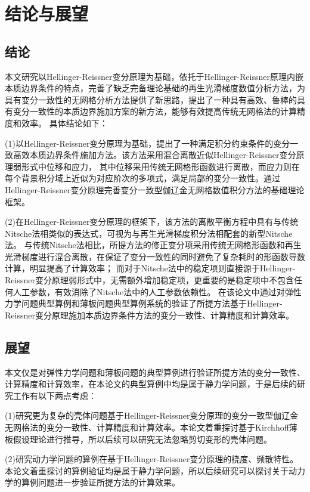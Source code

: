 \chapter{结论与展望}
\section{结论}
本文研究以Hellinger-Reissner变分原理为基础，依托于Hellinger-Reissner原理内嵌本质边界条件的特点，完善了缺乏完备理论基础的再生光滑梯度数值分析方法，为具有变分一致性的无网格分析方法提供了新思路，提出了一种具有高效、鲁棒的具有变分一致性的本质边界施加方案的新方法，能够有效提高传统无网格法的计算精度和效率。
具体结论如下：
\par
(1)以Hellinger-Reissner变分原理为基础，提出了一种满足积分约束条件的变分一致高效本质边界条件施加方法。该方法采用混合离散近似Hellinger-Reissner变分原理弱形式中位移和应力，
其中位移采用传统无网格形函数进行离散，而应力则在每个背景积分域上近似为对应阶次的多项式，满足局部的变分一致性。通过Hellinger-Reissner变分原理完善变分一致型伽辽金无网格数值积分方法的基础理论框架。
\par
(2)在Hellinger-Reissner变分原理的框架下，该方法的离散平衡方程中具有与传统Nitsche法相类似的表达式，可视为与再生光滑梯度积分法相配套的新型Nitsche法。
与传统Nitsche法相比，所提方法的修正变分项采用传统无网格形函数和再生光滑梯度进行混合离散，在保证了变分一致性的同时避免了复杂耗时的形函数导数计算，明显提高了计算效率；
而对于Nitsche法中的稳定项则直接源于Hellinger-Reissner变分原理弱形式中，无需额外增加稳定项，更重要的是稳定项中不包含任何人工参数，有效消除了Nitsche法中的人工参数依赖性。
在该论文中通过对弹性力学问题典型算例和薄板问题典型算例系统的验证了所提方法基于Hellinger-Reissner变分原理施加本质边界条件方法的变分一致性、计算精度和计算效率。
\section{展望}
本文仅是对弹性力学问题和薄板问题的典型算例进行验证所提方法的变分一致性、计算精度和计算效率，在本论文的典型算例中均是属于静力学问题，于是后续的研究工作有以下两点考虑：\par
(1)研究更为复杂的壳体问题基于Hellinger-Reissner变分原理的变分一致型伽辽金无网格法的变分一致性、计算精度和计算效率。本论文着重探讨基于Kirchhoff薄板假设理论进行推导，所以后续可以研究无法忽略剪切变形的壳体问题。\par
(2)研究动力学问题的算例在基于Hellinger-Reissner变分原理的挠度、频散特性。本论文着重探讨的算例验证均是属于静力学问题，所以后续研究可以探讨关于动力学的算例问题进一步验证所提方法的计算效果。
